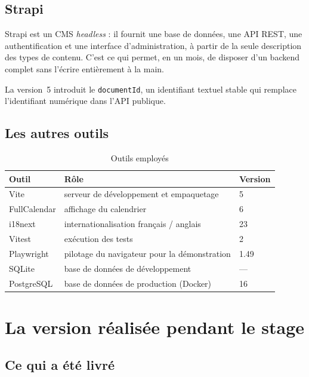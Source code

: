 \documentclass[11pt,a4paper]{report}
\begin{document}
\section{Strapi}

Strapi est un CMS \emph{headless} : il fournit une base de données, une API REST,
une authentification et une interface d'administration, à partir de la seule
description des types de contenu. C'est ce qui permet, en un mois, de disposer
d'un backend complet sans l'écrire entièrement à la main.

La version~5 introduit le \texttt{documentId}, un identifiant textuel stable qui
remplace l'identifiant numérique dans l'API publique.

\section{Les autres outils}

\begin{table}[h]
\centering
\begin{tabular}{@{}lll@{}}
\toprule
\textbf{Outil} & \textbf{Rôle} & \textbf{Version} \\
\midrule
Vite          & serveur de développement et empaquetage & 5 \\
FullCalendar  & affichage du calendrier                 & 6 \\
i18next       & internationalisation français / anglais & 23 \\
Vitest        & exécution des tests                     & 2 \\
Playwright    & pilotage du navigateur pour la démonstration & 1.49 \\
SQLite        & base de données de développement        & --- \\
PostgreSQL    & base de données de production (Docker)  & 16 \\
\bottomrule
\end{tabular}
\caption{Outils employés}
\end{table}

\chapter{La version réalisée pendant le stage}

\section{Ce qui a été livré}
\end{document}
